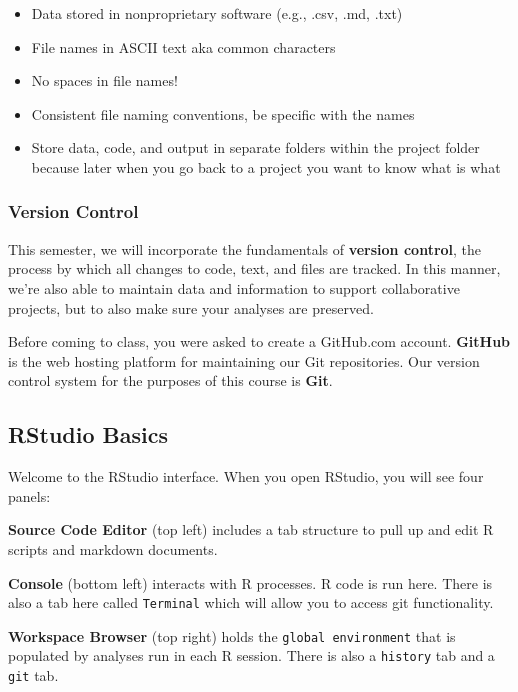 \documentclass[
]{article}
\providecommand{\tightlist}{%
  \setlength{\itemsep}{0pt}\setlength{\parskip}{0pt}}
\begin{document}
\begin{itemize}
\tightlist
\item
  Data stored in nonproprietary software (e.g., .csv, .md, .txt)
\item
  File names in ASCII text aka common characters
\item
  No spaces in file names!
\item
  Consistent file naming conventions, be specific with the names
\item
  Store data, code, and output in separate folders within the project
  folder because later when you go back to a project you want to know
  what is what
\end{itemize}

\hypertarget{version-control}{%
\subsubsection{Version Control}\label{version-control}}

This semester, we will incorporate the fundamentals of \textbf{version
control}, the process by which all changes to code, text, and files are
tracked. In this manner, we're also able to maintain data and
information to support collaborative projects, but to also make sure
your analyses are preserved.

Before coming to class, you were asked to create a GitHub.com account.
\textbf{GitHub} is the web hosting platform for maintaining our Git
repositories. Our version control system for the purposes of this course
is \textbf{Git}.

\hypertarget{rstudio-basics}{%
\subsection{RStudio Basics}\label{rstudio-basics}}

Welcome to the RStudio interface. When you open RStudio, you will see
four panels:

\textbf{Source Code Editor} (top left) includes a tab structure to pull
up and edit R scripts and markdown documents.

\textbf{Console} (bottom left) interacts with R processes. R code is run
here. There is also a tab here called \texttt{Terminal} which will allow
you to access git functionality.

\textbf{Workspace Browser} (top right) holds the
\texttt{global\ environment} that is populated by analyses run in each R
session. There is also a \texttt{history} tab and a \texttt{git} tab.
\end{document}
